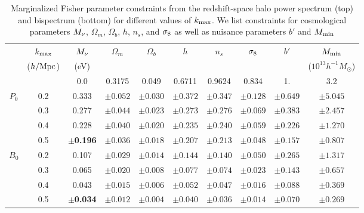 \begin{table}
    \caption{Marginalized Fisher parameter constraints from the redshift-space halo power 
    spectrum (top) and bispectrum (bottom) for different values of $k_{\rm max}$. We list 
    constraints for cosmological parameters $M_\nu$, $\Omega_m$, $\Omega_b$, $h$, $n_s$, 
    and $\sigma_8$ as well as nuisance parameters $b'$ and $M_{\rm min}$} 
\begin{center} 
    \begin{tabular}{cccccccccc} \toprule
         & $k_{\rm max}$ & $M_\nu$ & $\Omega_m$ & $\Omega_b$ & $h$ & $n_s$ & $\sigma_8$ & $b'$ & $M_{\rm min}$ \\
         & ({\footnotesize $h/{\rm Mpc}$}) &({\footnotesize eV}) & & & & & & & ({\footnotesize $10^{13} h^{-1}M_\odot$}) \\[3pt] \hline\hline

            &     & 0.0 & 0.3175 & 0.049 & 0.6711 & 0.9624 & 0.834 & 1. & 3.2  \\ 
    $P_0$  & 0.2 & 0.333 & $\pm0.052$ & $\pm0.030$ & $\pm0.372$ & $\pm0.347$ & $\pm0.128$ & $\pm0.649$ & $\pm5.045$\\
           & 0.3 & 0.277 & $\pm0.044$ & $\pm0.023$ & $\pm0.273$ & $\pm0.276$ & $\pm0.069$ & $\pm0.383$ & $\pm2.457$\\
           & 0.4 & 0.228 & $\pm0.040$ & $\pm0.020$ & $\pm0.235$ & $\pm0.240$ & $\pm0.059$ & $\pm0.226$ & $\pm1.270$\\
           & 0.5 &$\pm${\bf 0.196}& $\pm0.036$ & $\pm0.018$ & $\pm0.207$ & $\pm0.213$ & $\pm0.048$ & $\pm0.157$ & $\pm0.807$\\
                      
    $B_0$  & 0.2 & 0.107 & $\pm0.029$ & $\pm0.014$ & $\pm0.144$ & $\pm0.140$ & $\pm0.050$ & $\pm0.265$ & $\pm1.317$\\
           & 0.3 & 0.065 & $\pm0.020$ & $\pm0.008$ & $\pm0.077$ & $\pm0.074$ & $\pm0.023$ & $\pm0.143$ & $\pm0.657$\\
           & 0.4 & 0.043 & $\pm0.015$ & $\pm0.006$ & $\pm0.052$ & $\pm0.047$ & $\pm0.016$ & $\pm0.088$ & $\pm0.369$\\
           & 0.5 &$\pm${\bf 0.034}& $\pm0.012$ & $\pm0.004$ & $\pm0.040$ & $\pm0.036$ & $\pm0.014$ & $\pm0.070$ & $\pm0.269$\\[3pt]
    \hline
\end{tabular} \label{tab:forecast}
\end{center}
\end{table}

